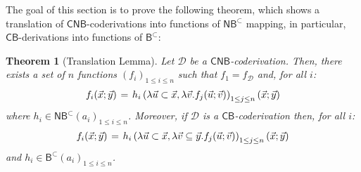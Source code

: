 \documentclass[manuscript,screen]{acmart}
\newcommand{\red}[1]{{\color{red}#1}}
\newcommand{\anupam}[1]{\todo{A: #1}}
\newtheorem{thm}{Theorem}
\theoremstyle{definition}
\theoremstyle{remark}
\newcommand{\permpref}{\subset}
\newcommand{\model}[1]{\denot{#1}}
\newcommand{\denot}[1]{f_{#1}}
\newcommand{\bc}{\mathsf{B}}
\newcommand{\bcwfpo}[1]{\bc^{#1}}
\newcommand{\nested}{\mathsf{N}}
\newcommand{\nbcwfpo}[1]{\nested\bcwfpo{#1}}
\newcommand{\bcpp}{\bcwfpo{\permpref}}
\newcommand{\nbcpp}{\nbcwfpo{\permpref}}
\newcommand{\der}{\mathcal{D}}
\newcommand{\cyclic}{\mathsf{C}}
\newcommand{\cbc}{\cyclic\bc}
\newcommand{\ncbc}{\cyclic\nested\bc}
\begin{document}
 
The goal of this section is to prove the following theorem, which shows  a translation of  $\ncbc$-coderivations into   functions of $\nbcpp$   mapping, in particular,    $\cbc$-derivations into functions of $\bcpp$:

 
\begin{thm}[Translation Lemma]\label{lem:short-translation-lemma}
Let $\der$ be a  $\ncbc$-coderivation. Then, there exists a set of $n$ functions $(f_i)_{1 \leq i \leq n}$ such that $f_{1}= \model{\der}$ and, for all $i$:
\begin{equation}\label{eqn:naive1}
\arraycolsep=2pt
\begin{array}{rcl}
 f_i(\vec{x}; \vec{y})   & = & h_i\left( \lambda \vec{u}\subset \vec{x},\lambda \vec v. f_j(\vec{u};\vec v)\right)_{1 \leq j \leq n}(\vec{x}; \vec{y})
\end{array}
\end{equation}
where  $h_i \in \nbcpp (a_i)_{1 \leq i \leq n}$. Moreover, if    $\der$ is a $\cbc$-coderivation  then, for all $i$:
\begin{equation}\label{eqn:naive2}
\arraycolsep=2pt
\begin{array}{rcl}
 f_i(\vec{x}; \vec{y})   & = & h_i\left( \lambda \vec{u}\subset \vec{x},\lambda \vec v\subseteq \vec y. f_j(\vec{u};\vec v)\right)_{1 \leq j \leq n}(\vec{x}; \vec{y})
\end{array}
\end{equation}
and  $h_i \in \bcpp  (a_i)_{1 \leq i \leq n}$.
\end{thm} 
\end{document}
